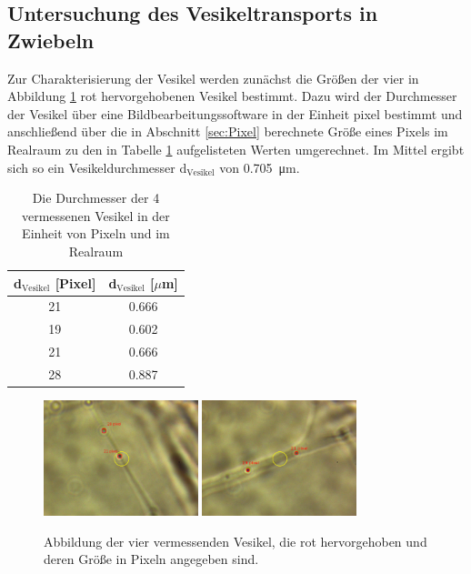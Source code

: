     \subsection{Untersuchung des Vesikeltransports in Zwiebeln}
        \FloatBarrier
        Zur Charakterisierung der Vesikel werden zunächst die Größen der vier in Abbildung \ref{fig:vesikel_size} rot hervorgehobenen Vesikel bestimmt. Dazu wird der Durchmesser der Vesikel über eine 
        Bildbearbeitungssoftware in der Einheit pixel bestimmt und anschließend über die in Abschnitt \ref{sec:Pixel} berechnete Größe eines Pixels im Realraum zu den in Tabelle \ref{tab:d_vesikel} aufgelisteten Werten 
        umgerechnet. Im Mittel ergibt sich so ein Vesikeldurchmesser d$_\text{Vesikel}$ von \SI{0.705}{\micro\metre}.
        \begin{table}[h]
            \centering
            \caption{Die Durchmesser der 4 vermessenen Vesikel in der Einheit von Pixeln und im Realraum}
            \label{tab:d_vesikel}
            \begin{tabular}{c c}
            \toprule
            {d$_\text{Vesikel}$ [Pixel]} & {d$_\text{Vesikel}$ [$\mu$m]}  \\
            \midrule
            21	 &  0.666  \\
            19	 &  0.602  \\
            21	 &  0.666  \\
            28	 &  0.887  \\
            \bottomrule
            \end{tabular}
        \end{table}
        \begin{figure}[h]
        \centering
        \includegraphics[width = 0.4\textwidth]{pictures/vesikel_size_1.png}
        \includegraphics[width = 0.4\textwidth]{pictures/vesikel_size_2.png}
        \caption{Abbildung der vier vermessenden Vesikel, die rot hervorgehoben und deren Größe in Pixeln angegeben sind.}
        \label{fig:vesikel_size}
        \end{figure}

